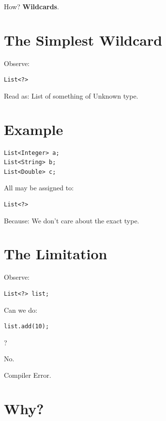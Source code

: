 \documentclass[11pt,a4paper]{book}
\begin{document}
How?
\textcolor{RosettaRoyalPurple}{\textbf{Wildcards}}.

\section{The Simplest Wildcard}

Observe:

\begin{verbatim} 
List<?>
\end{verbatim}

Read as:
List of something of
Unknown type.

\section{Example}

\begin{verbatim} 
List<Integer> a;
List<String> b;
List<Double> c;
\end{verbatim}

All may be assigned to:

\begin{verbatim} 
List<?>
\end{verbatim}

Because:
We don't care about the exact type.

\section{The Limitation}

Observe:

\begin{verbatim} 
List<?> list;
\end{verbatim}

Can we do:

\begin{verbatim} 
list.add(10);
\end{verbatim}

?

\textcolor{RosettaOrange}{No}.

Compiler Error.

\section{Why?}
\end{document}

